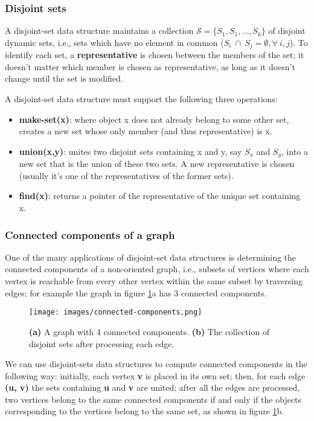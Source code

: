 \documentclass[11pt]{article}
\begin{document}
    \subsubsection{Disjoint sets}
    A disjoint-set data structure maintains a collection $\mathcal{S} = \{S_1, S_1, \dots, S_k\}$ of disjoint dynamic sets, i.e., sets which have no element in common ($S_i \ \cap \ S_j = \emptyset, \forall \ i,j$).
    To identify each set, a \textbf{representative} is chosen between the members of the set; it doesn't matter which member is chosen as representative, as long as it doesn't change until the set is modified. 

    A disjoint-set data structure must support the following three operations:
    \begin{itemize}
        \item \textbf{make-set(x)}: where object x does not already belong to some other set, creates a new set whose only member (and thus representative) is x.
        \item \textbf{union(x,y)}: unites two disjoint sets containing x and y, say $S_x$ and $S_y$, into a new set that is the union of these two sets. A new representative is chosen (usually it's one of the representatives of the former sets).
        \item \textbf{find(x)}: returns a pointer of the representative of the unique set containing x.
    \end{itemize}
    \subsubsection{Connected components of a graph}\label{subsubsec:connected-components}
    One of the many applications of disjoint-set data structures is determining the connected components of a non-oriented graph, i.e., subsets of vertices where each vertex is reachable from every other vertex within the same subset by traversing edges; for example the graph in  figure \ref{fig:connected-components-example}a has 3 connected components.
    \begin{figure}[H]
        \centering
        \texttt{[image: images/connected-components.png]}
        \caption{ \textbf{(a)} A graph with 4 connected components. \textbf{(b)} The collection of disjoint sets after processing each edge.}
        \label{fig:connected-components-example}
    \end{figure}
    
    We can use disjoint-sets data structures to compute connected components in the following way: initially, each vertex \textbf{v} is placed in its own set; then, for each edge \textbf{(u, v)} the sets containing \textbf{u} and \textbf{v} are united; after all the edges are processed, two vertices belong to the same connected components if and only if the objects corresponding to the vertices belong to the same set, as shown in figure \ref{fig:connected-components-example}b.
    
\end{document}
